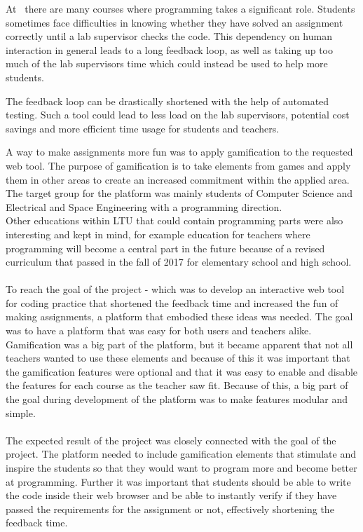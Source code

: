 At \LTU\ there are many courses where programming takes a significant role. Students sometimes face difficulties in knowing whether they have solved an assignment correctly until a lab supervisor checks the code. This dependency on human interaction in general leads to a long feedback loop, as well as taking up too much of the lab supervisors time which could instead be used to help more students. 

The feedback loop can be drastically shortened with the help of automated testing. Such a tool could lead to less load on the lab supervisors, potential cost savings and more efficient time usage for students and teachers.

A way to make assignments more fun was to apply gamification to the requested web tool. The purpose of gamification is to take elements from games and apply them in other areas to create an increased commitment within the applied area. The target group for the platform was mainly students of Computer Science and Electrical and Space Engineering with a programming direction.\\
Other educations within LTU that could contain programming parts were also interesting and kept in mind, for example education for teachers where programming will become a central part in the future because of a revised curriculum that passed in the fall of 2017 for elementary school and high school.\\
\\
To reach the goal of the project - which was to develop an interactive web tool for coding practice that shortened the feedback time and increased the fun of making assignments, a platform that embodied these ideas was needed. The goal was to have a platform that was easy for both users and teachers alike. Gamification was a big part of the platform, but it became apparent that not all teachers wanted to use these elements and because of this it was important that the gamification features were optional and that it was easy to enable and disable the features for each course as the teacher saw fit. Because of this, a big part of the goal during development of the platform was to make features modular and simple.\\
\\
The expected result of the project was closely connected with the goal of the project. The platform needed to include gamification elements that stimulate and inspire the  students so that they would want to program more and become better at programming. Further it was important that students should be able to write the code inside their web browser and be able to instantly verify if they have passed the requirements for the assignment or not, effectively shortening the feedback time.\\
